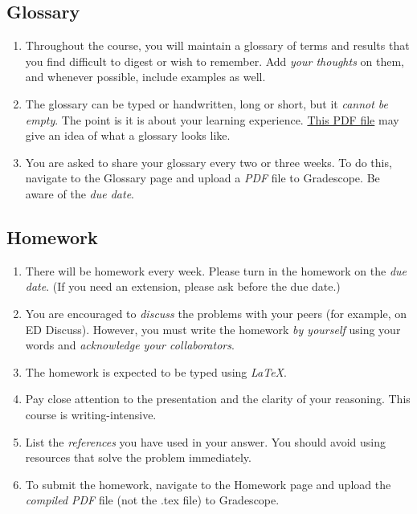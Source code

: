 \documentclass[12pt]{article}
\begin{document}
\subsection{Glossary}
\begin{enumerate}
	\item Throughout the course, you will maintain a glossary of terms and results that you find difficult to digest or wish to remember. Add \emph{your thoughts} on them, and whenever possible, include examples as well.
	\item The glossary can be typed or handwritten, long or short, but it \emph{cannot be empty}. The point is it is about your learning experience. \href{https://everydaymath.uchicago.edu/teachers/TRM-Glossary-G4-6_correct.pdf}{This PDF file} may give an idea of what a glossary looks like. 
	\item You are asked to share your glossary every two or three weeks. To do this, navigate to the Glossary page and upload a \emph{PDF} file to Gradescope. Be aware of the \emph{due date}. 
\end{enumerate}

\subsection{Homework}
\begin{enumerate}
	\item There will be homework every week. Please turn in the homework on the \emph{due date}. (If you need an extension, please ask before the due date.)
	\item You are encouraged to \emph{discuss} the problems with your peers (for example, on ED Discuss). However, you must write the homework \emph{by yourself} using your words and \emph{acknowledge your collaborators}. 
	\item The homework is expected to be typed using \emph{\LaTeX}. 
	\item Pay close attention to the presentation and the clarity of your reasoning. This course is writing-intensive.
	\item List the \emph{references} you have used in your answer. You should avoid using resources that solve the problem immediately. 
	\item To submit the homework, navigate to the Homework page and upload the \emph{compiled PDF} file (not the .tex file) to Gradescope. 
\end{enumerate}
\end{document}
